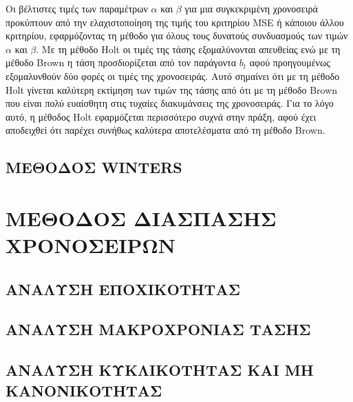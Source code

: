 Οι βέλτιστες τιμές των παραμέτρων $ \alpha $ και $ \beta $ για μια συγκεκριμένη χρονοσειρά
προκύπτουν από την ελαχιστοποίηση της τιμής του κριτηρίου MSE ή κάποιου άλλου
κριτηρίου, εφαρμόζοντας τη μέθοδο για όλους τους δυνατούς συνδυασμούς των
τιμών $ \alpha $ και $ \beta $. Με τη μέθοδο Holt οι τιμές της τάσης εξομαλύνονται απευθείας ενώ με
τη μέθοδο Brown η τάση προσδιορίζεται από τον παράγοντα $b_t$ αφού προηγουμένως
εξομαλυνθούν δύο φορές οι τιμές της χρονοσειράς. Αυτό σημαίνει ότι με τη μέθοδο
Holt γίνεται καλύτερη εκτίμηση των τιμών της τάσης από ότι με τη μέθοδο Brown
που είναι πολύ ευαίσθητη στις τυχαίες διακυμάνσεις της χρονοσειράς. Για το λόγο
αυτό, η μέθοδος Holt εφαρμόζεται περισσότερο συχνά στην πράξη, αφού έχει
αποδειχθεί ότι παρέχει συνήθως καλύτερα αποτελέσματα από τη μέθοδο Brown.


\subsection{ΜΕΘΟΔΟΣ WINTERS}
\section{ΜΕΘΟΔΟΣ ΔΙΑΣΠΑΣΗΣ ΧΡΟΝΟΣΕΙΡΩΝ}
\subsection{ΑΝΑΛΥΣΗ ΕΠΟΧΙΚΟΤΗΤΑΣ }
\subsection{ΑΝΑΛΥΣΗ ΜΑΚΡΟΧΡΟΝΙΑΣ ΤΑΣΗΣ}
\subsection{ΑΝΑΛΥΣΗ ΚΥΚΛΙΚΟΤΗΤΑΣ ΚΑΙ ΜΗ ΚΑΝΟΝΙΚΟΤΗΤΑΣ}







\endinput
